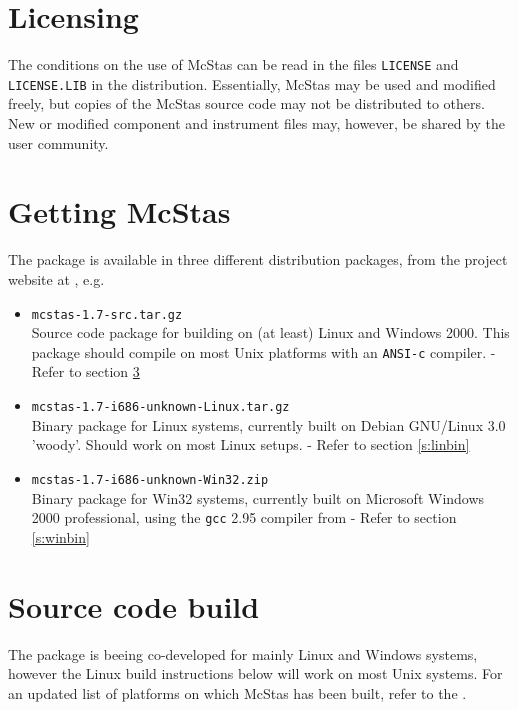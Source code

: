 \label{s:install}
\section{Licensing}
The conditions on the use of McStas can be read in the files
\verb+LICENSE+ and \verb+LICENSE.LIB+ in the distribution. Essentially,
McStas may be used and modified freely, but copies of the McStas source code 
may not be distributed to others. 
New or modified component and instrument files may, however, be shared by 
the user community.

\section{Getting McStas}
\label{s:obtain}
The  package is
available in three different distribution packages, from the project
website at
, e.g.
\begin{itemize}
\item{\texttt{mcstas-1.7-src.tar.gz}\\Source code package for
    building  on
    (at least) Linux and Windows 2000. This package should compile on
    most Unix platforms with an \texttt{ANSI-c} compiler. - Refer to section \ref{s:src}}
\item{\texttt{mcstas-1.7-i686-unknown-Linux.tar.gz}\\Binary package
  for Linux systems, currently built on Debian GNU/Linux 3.0 'woody'. 
  Should work on most Linux setups.
 - Refer to section \ref{s:linbin}}
\item{\texttt{mcstas-1.7-i686-unknown-Win32.zip}\\Binary package
  for Win32 systems, currently built on Microsoft Windows 2000
  professional, using the \texttt{gcc} 2.95 compiler from 
   - Refer to section \ref{s:winbin}}
\end{itemize}
\section{Source code build}
\label{s:src}
The  package is
beeing co-developed for mainly Linux and Windows systems, however 
the Linux build instructions below will work on most Unix
systems. For an updated list of platforms on which McStas has been
built, refer to the .
